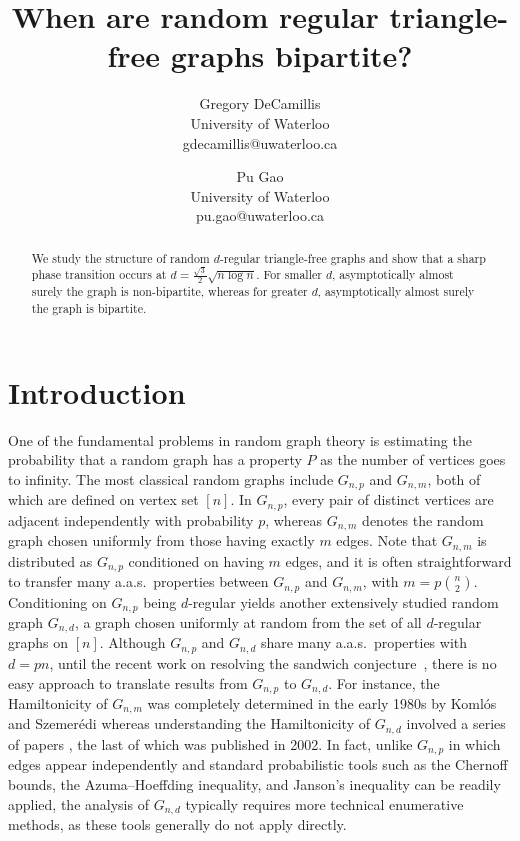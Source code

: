 \documentclass[11pt]{article}
\title{When are random regular triangle-free graphs bipartite?}
\author{Gregory DeCamillis\\ University of Waterloo\\ gdecamillis@uwaterloo.ca \and Pu Gao \\ University of Waterloo\\ pu.gao@uwaterloo.ca}
\date{}
\theoremstyle{plain}
\begin{document}
\maketitle

\begin{abstract}

We study the structure of random $d$-regular triangle-free graphs and show that a sharp phase transition occurs at $d=\frac{\sqrt 3}{2}\sqrt{n \log n}$. For smaller $d$, asymptotically almost surely the graph is non-bipartite, whereas for greater $d$, asymptotically almost surely the graph is bipartite.


\end{abstract}

\section{Introduction}
One of the fundamental problems in random graph theory is estimating the probability that a random graph has a property $P$ as the number of vertices goes to infinity. The most classical random graphs include $G_{n,p}$ and $G_{n,m}$, both of which are defined on vertex set $[n]$. In $G_{n,p}$, every pair of distinct vertices are adjacent independently with probability $p$, whereas $G_{n,m}$ denotes the random graph chosen uniformly from those having exactly $m$ edges.  Note that $G_{n,m}$ is distributed as $G_{n,p}$ conditioned on having $m$ edges, and it is often straightforward to transfer many a.a.s.\ properties between $G_{n,p}$ and $G_{n,m}$, with $m=p\binom{n}{2}$.  Conditioning on $G_{n,p}$ being $d$-regular yields another extensively studied random graph  $G_{n,d}$, a  graph chosen uniformly at random from the set of all $d$-regular graphs on $[n]$. Although $G_{n,p}$ and $G_{n,d}$ share many a.a.s.\ properties with $d=pn$, until the recent work on resolving the sandwich conjecture~\cite{behague2025proof, gao2025kimvussandwichconjecturetrue, gao2025sandwichingrandomregulargraphs}, there is no easy approach to translate results from $G_{n,p}$ to $G_{n,d}$. For instance, the Hamiltonicity of $G_{n,m}$ was completely determined in the early 1980s by Koml\'os and Szemer\'edi \cite{KOMLOS198355} whereas understanding the Hamiltonicity of $G_{n,d}$ involved a series of papers \cite{BOLLOBAS198397,COOPER_FRIEZE_REED_2002, FENNER1983301,  Krivelevich2001, Robinson1992, Robinson1994}, the last of which was published in 2002. In fact, unlike $G_{n,p}$ in which edges appear independently and standard probabilistic tools such as the Chernoff bounds, the Azuma--Hoeffding inequality, and Janson's inequality can be readily applied, the analysis of $G_{n,d}$ typically requires more technical enumerative methods, as these tools generally do not apply directly.
\end{document}
